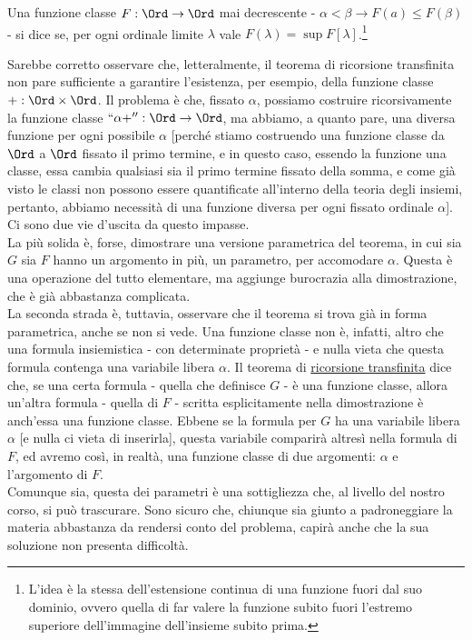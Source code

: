 \documentclass[11pt]{scrartcl}
\begin{document}
\begin{definition}[Continuità]
	Una funzione classe $F : \Ord \rightarrow \Ord$ mai decrescente - $\alpha < \beta \rightarrow F(a) \leq F(\beta)$ - si dice  se, per ogni ordinale limite $\lambda$ vale $F(\lambda) = \sup F[\lambda]$.\footnote{L'idea è la stessa dell'estensione continua di una funzione fuori dal suo dominio, ovvero quella 
	di far valere la funzione subito fuori l'estremo superiore dell'immagine dell'insieme subito prima.}
\end{definition}
\pagebreak
\begin{notation}
	Sarebbe corretto osservare che, letteralmente, il teorema di ricorsione transfinita non pare sufficiente a garantire l'esistenza, per esempio, della funzione classe $+ : \Ord \times \Ord$.
	Il problema è che, fissato $\alpha$, possiamo costruire ricorsivamente la funzione classe $``\alpha+'' : \Ord \rightarrow \Ord$, ma abbiamo, a quanto pare, una diversa funzione per ogni possibile $\alpha$ [perché stiamo costruendo una funzione classe da $\Ord$ a $\Ord$ fissato il primo termine, e in questo caso, essendo la funzione una classe, 
	essa cambia qualsiasi sia il primo termine fissato della somma, e come già visto le classi non possono essere quantificate all'interno della teoria degli insiemi, pertanto, abbiamo necessità di una funzione diversa per ogni fissato ordinale $\alpha$]. Ci sono due vie d'uscita da questo impasse.\\
	La più solida è, forse, dimostrare una versione parametrica del teorema, in cui sia $G$ sia $F$ hanno un argomento in più, un parametro, per accomodare $\alpha$.
	Questa è una operazione del tutto elementare, ma aggiunge burocrazia alla dimostrazione, che è già abbastanza complicata.\\
	La seconda strada è, tuttavia, osservare che il teorema si trova già in forma parametrica, anche se non si vede. Una funzione classe non è, infatti, altro che una formula insiemistica - con determinate proprietà - e nulla vieta 
	che questa formula contenga una variabile libera $\alpha$. Il teorema di \hyperref[ric_transf1]{ricorsione transfinita} dice che, se una certa formula - quella che definisce $G$ - è una funzione classe, allora un'altra formula - quella di $F$ - scritta esplicitamente nella 
	dimostrazione è anch'essa una funzione classe. Ebbene se la formula per $G$ ha una variabile libera $\alpha$ [e nulla ci vieta di inserirla], questa variabile comparirà altresì nella formula di $F$, ed avremo così, in realtà, una funzione classe di due argomenti: $\alpha$ e l'argomento di $F$.\\
	Comunque sia, questa dei parametri è una sottigliezza che, al livello del nostro corso, si può trascurare. Sono sicuro che, chiunque sia giunto a padroneggiare la materia abbastanza da rendersi conto del problema, capirà anche che la sua soluzione 
	non presenta difficoltà.
\end{notation}
\end{document}
